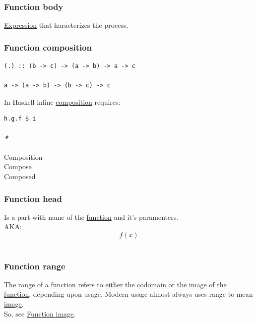 \documentclass[11pt]{article}
\begin{document}
\subsubsection{\label{orgbd93348}Function body}
\label{sec:orga1216dc}
\hyperref[org9021dd7]{Expression} that haracterizes the process.\\

\subsubsection{\label{org3802537}Function composition}
\label{sec:org7c5e142}
\begin{verbatim}
(.) :: (b -> c) -> (a -> b) -> a -> c

a -> (a -> b) -> (b -> c) -> c
\end{verbatim}

In Haskell inline \hyperref[orga128e7f]{composition} requires:\\
\begin{verbatim}
h.g.f $ i
\end{verbatim}

\paragraph{\emph{*}}
\label{sec:org8bbf4d4}

\label{orgbc525a5}Composition\\
\label{org5956f19}Compose\\
\label{orgc78ac5d}Composed\\

\subsubsection{\label{org6eabca3}Function head}
\label{sec:org4f0aa94}
Is a part with name of the \hyperref[orge15bc14]{function} and it's paramenters.\\
AKA: $$ f(x) $$\\

\subsubsection{\label{orgd4c7dcf}Function range}
\label{sec:org85ee1ee}
The range of a \hyperref[orge15bc14]{function} refers to \hyperref[org6f16842]{either} the \hyperref[org410079d]{codomain} or the \hyperref[orgef20814]{image} of the \hyperref[orge15bc14]{function}, depending upon usage. Modern usage almost always uses range to mean \hyperref[orgef20814]{image}.\\
So, see \hyperref[org7a15735]{Function image}.\\
\end{document}
